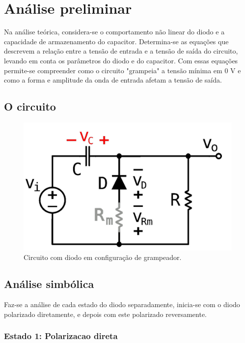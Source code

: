 \section{Análise preliminar}

Na análise teórica, considera-se o comportamento não linear do diodo e a capacidade de armazenamento do capacitor. Determina-se as equações que descrevem a relação entre a tensão de entrada e a tensão de saída do circuito, levando em conta os parâmetros do diodo e do capacitor. Com essas equações permite-se compreender como o circuito "grampeia" a tensão mínima em 0 V e como a forma e amplitude da onda de entrada afetam a tensão de saída.

\subsection{O circuito}

\begin{figure}[h]
    \centering
    \includegraphics[width=1\columnwidth]{images/o_circuito.png}
    \caption{Circuito com diodo em configuração de grampeador.}
\end{figure}

\newpage
\subsection{Análise simbólica}

Faz-se a análise de cada estado do diodo separadamente, inicia-se com o diodo polarizado diretamente, e depois com este polarizado reversamente.

\subsubsection{Estado 1: Polarizacao direta}

